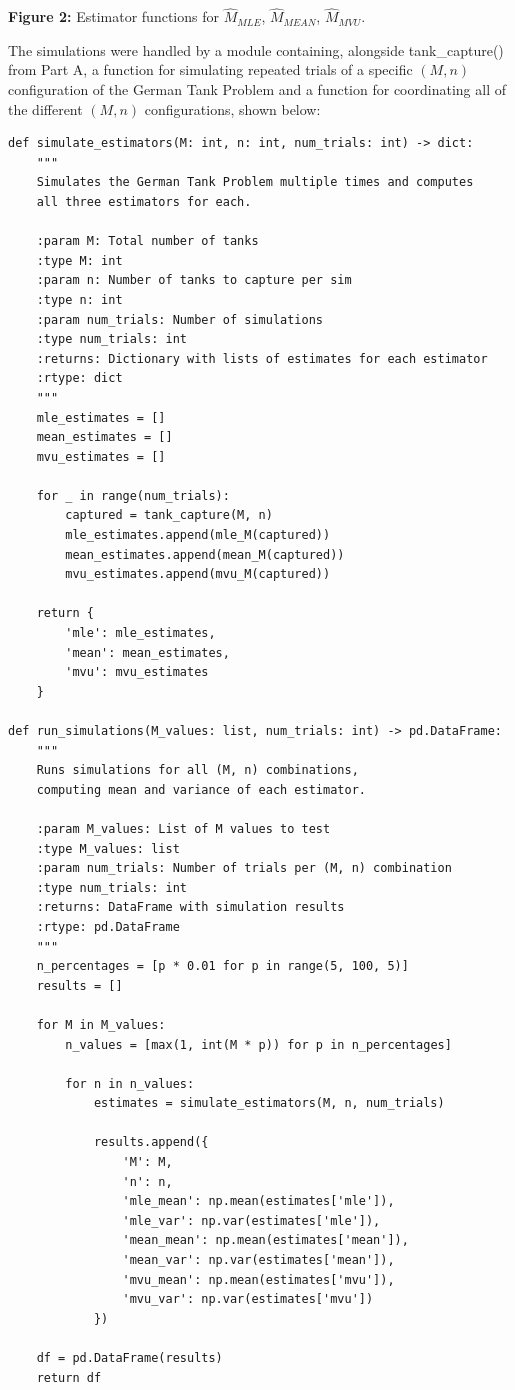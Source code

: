 \begin{center}
\textbf{Figure 2:} Estimator functions for $\hat{M}_{MLE}$, $\hat{M}_{MEAN}$, $\hat{M}_{MVU}$.\\
\end{center}

The simulations were handled by a module containing, alongside tank\_capture() from Part A, a function for simulating repeated trials of a specific $ (M, n) $ configuration of the German Tank Problem and a function for coordinating all of the different $ (M, n) $ configurations, shown below:

\begin{verbatim}
def simulate_estimators(M: int, n: int, num_trials: int) -> dict:
    """
    Simulates the German Tank Problem multiple times and computes
    all three estimators for each.
    
    :param M: Total number of tanks
    :type M: int
    :param n: Number of tanks to capture per sim
    :type n: int
    :param num_trials: Number of simulations
    :type num_trials: int
    :returns: Dictionary with lists of estimates for each estimator
    :rtype: dict
    """
    mle_estimates = []
    mean_estimates = []
    mvu_estimates = []
    
    for _ in range(num_trials):
        captured = tank_capture(M, n)
        mle_estimates.append(mle_M(captured))
        mean_estimates.append(mean_M(captured))
        mvu_estimates.append(mvu_M(captured))
    
    return {
        'mle': mle_estimates,
        'mean': mean_estimates,
        'mvu': mvu_estimates
    }

def run_simulations(M_values: list, num_trials: int) -> pd.DataFrame:
    """
    Runs simulations for all (M, n) combinations,
    computing mean and variance of each estimator.
    
    :param M_values: List of M values to test
    :type M_values: list
    :param num_trials: Number of trials per (M, n) combination
    :type num_trials: int
    :returns: DataFrame with simulation results
    :rtype: pd.DataFrame
    """
    n_percentages = [p * 0.01 for p in range(5, 100, 5)]
    results = []
    
    for M in M_values:
        n_values = [max(1, int(M * p)) for p in n_percentages]
        
        for n in n_values: 
            estimates = simulate_estimators(M, n, num_trials)
            
            results.append({
                'M': M,
                'n': n,
                'mle_mean': np.mean(estimates['mle']),
                'mle_var': np.var(estimates['mle']),
                'mean_mean': np.mean(estimates['mean']),
                'mean_var': np.var(estimates['mean']),
                'mvu_mean': np.mean(estimates['mvu']),
                'mvu_var': np.var(estimates['mvu'])
            })
    
    df = pd.DataFrame(results)
    return df
\end{verbatim}

